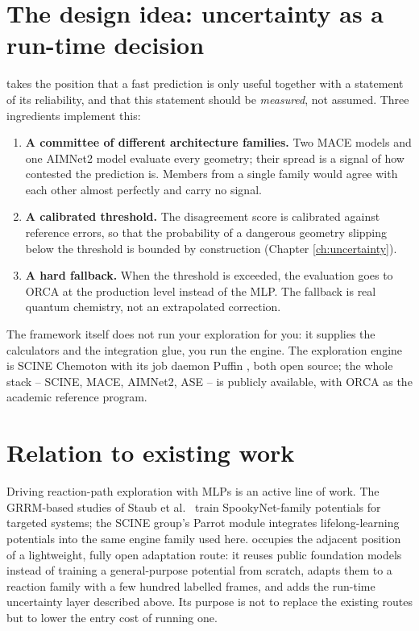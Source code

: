 \section{The design idea: uncertainty as a run-time decision}

\jns{} takes the position that a fast prediction is only useful together
with a statement of its reliability, and that this statement should be
\emph{measured}, not assumed.  Three ingredients implement this:

\begin{enumerate}
  \item \textbf{A committee of different architecture families.}  Two MACE
    models and one AIMNet2 model evaluate every geometry; their spread is a
    signal of how contested the prediction is.  Members from a single family
    would agree with each other almost perfectly and carry no signal.
  \item \textbf{A calibrated threshold.}  The disagreement score is
    calibrated against reference errors, so that the probability of a
    dangerous geometry slipping below the threshold is bounded by
    construction (Chapter \ref{ch:uncertainty}).
  \item \textbf{A hard fallback.}  When the threshold is exceeded, the
    evaluation goes to ORCA at the production level instead of the MLP.  The
    fallback is real quantum chemistry, not an extrapolated correction.
\end{enumerate}

The framework itself does not run your exploration for you: it supplies the
calculators and the integration glue, you run the engine.  The exploration
engine is SCINE Chemoton \cite{unsleber2022chemoton,weymuth2024scine} with
its job daemon Puffin \cite{bensberg2025puffin}, both open source; the whole
stack -- SCINE, MACE, AIMNet2, ASE \cite{larsen2017ase} -- is publicly
available, with ORCA \cite{neese2022orca} as the academic reference program.

\section{Relation to existing work}

Driving reaction-path exploration with MLPs is an active line of work.  The
GRRM-based studies of Staub et al.\ \cite{staub2023,staub2025} train
SpookyNet-family potentials for targeted systems; the SCINE group's Parrot
module \cite{eckhoff2025parrot} integrates lifelong-learning potentials into
the same engine family used here.  \jns{} occupies the adjacent position of
a lightweight, fully open adaptation route: it reuses public foundation
models instead of training a general-purpose potential from scratch, adapts
them to a reaction family with a few hundred labelled frames, and adds the
run-time uncertainty layer described above.  Its purpose is not to replace
the existing routes but to lower the entry cost of running one.

